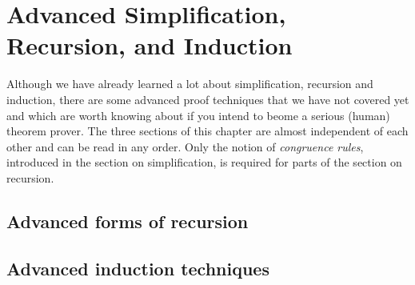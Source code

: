 \chapter{Advanced Simplification, Recursion, and Induction}

Although we have already learned a lot about simplification, recursion and
induction, there are some advanced proof techniques that we have not covered
yet and which are worth knowing about if you intend to beome a serious
(human) theorem prover. The three sections of this chapter are almost
independent of each other and can be read in any order. Only the notion of
\emph{congruence rules}, introduced in the section on simplification, is
required for parts of the section on recursion.



\section{Advanced forms of recursion}
\label{sec:advanced-recdef}




\section{Advanced induction techniques}
\label{sec:advanced-ind}

